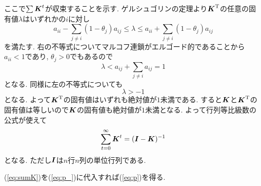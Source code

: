 ここで$ \sum \boldsymbol{K}^t $が収束することを示す. 
ゲルシュゴリンの定理\cite{s_saito}より$ \boldsymbol{K}^{\mathrm{T}} $の任意の固有値$ \lambda $はいずれかの$ i $に対し
\begin{equation}
    a_{i i} - \sum_{j \ne i}(1 - \theta_j) a_{i j} \le \lambda \le a_{i i} + \sum_{j \ne i}(1 - \theta_j) a_{i j}
\end{equation}
を満たす. 右の不等式についてマルコフ連鎖がエルゴード的であることから$ a_{i i} < 1 $であり, \cite{funaki}$ \theta_j > 0 $でもあるので
\begin{equation}
    \lambda < a_{i j} + \sum_{j \ne i} a_{i j} = 1
\end{equation}
となる. 同様に左の不等式についても
\begin{equation}
    \lambda > -1
\end{equation}
となる. よって$ \boldsymbol{K}^\mathrm{T} $の固有値はいずれも絶対値が$ 1 $未満である. すると$ \boldsymbol{K} $と$ \boldsymbol{K}^{\mathrm{T}} $の固有値は等しいので$ \boldsymbol{K} $の固有値も絶対値が$ 1 $未満となる. 
よって行列等比級数の公式が使えて\cite{m_saito}
\begin{equation} \label{eq:sumK}
    \sum_{t=0}^{\infty} \boldsymbol{K}^t = (\boldsymbol{I} - \boldsymbol{K})^{-1}
\end{equation}
となる. ただし$ \boldsymbol{I} $は$ n $行$ n $列の単位行列である. 

(\ref{eq:sumK})を(\ref{eq:p_})に代入すれば(\ref{eq:p})を得る. 
